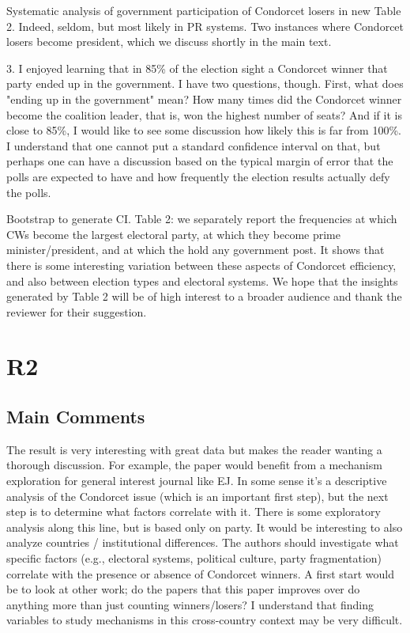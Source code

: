 \documentclass[a4paper, 12pt]{scrartcl}
\theoremstyle{break}
\newenvironment{changes}{\par\color{violet}\par\addvspace{\baselineskip}}{\par\addvspace{\baselineskip}}
\begin{document}
Systematic analysis of government participation of Condorcet losers in new Table 2. Indeed, seldom, but most likely in PR systems. Two instances where Condorcet losers become president, which we discuss shortly in the main text.

\begin{changes}
	3. I enjoyed learning that in 85\% of the election sight a Condorcet winner that party ended up in the government. I have two questions, though. First, what does "ending up in the government" mean? How many times did the Condorcet winner become the coalition leader, that is, won the highest number of seats? And if it is close to 85\%, I would like to see some discussion how likely this is far from 100\%. I understand that one cannot put a standard confidence interval on that, but perhaps one can have a discussion based on the typical margin of error that the polls are expected to have and how frequently the election results actually defy the polls. 
\end{changes}

Bootstrap to generate CI. 
Table 2: we separately report the frequencies at which CWs become the largest electoral party, at which they become prime minister/president, and at which the hold any government post. It shows that there is some interesting variation between these aspects of Condorcet efficiency, and also between election types and electoral systems. We hope that the insights generated by Table 2 will be of high interest to a broader audience and thank the reviewer for their suggestion.


\newpage
\section{R2}
\subsection{Main Comments}
\begin{changes}
	The result is very interesting with great data but makes the reader wanting a thorough discussion. For example, the paper would benefit from a mechanism exploration for general interest journal like EJ. In some sense it’s a descriptive analysis of the Condorcet issue (which is an important first step), but the next step is to determine what
	factors correlate with it. There is some exploratory analysis along this line, but is based only on party. It would be interesting to also analyze countries / institutional differences. The authors should investigate what specific factors (e.g., electoral systems, political culture, party fragmentation) correlate with the presence or absence of Condorcet winners. A first start would be to look at other work; do the papers
	that this paper improves over do anything more than just counting winners/losers? I understand that finding variables to study mechanisms in this cross-country context may be very difficult.
\end{changes}
\end{document}
